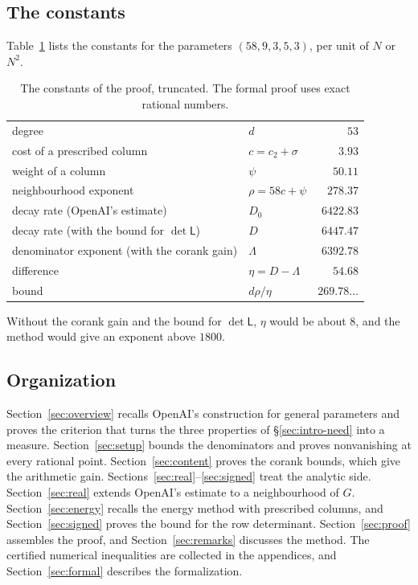 \documentclass[11pt]{amsart}
\theoremstyle{definition}
\theoremstyle{remark}
\numberwithin{equation}{section}
\begin{document}
\subsection{The constants}
Table~\ref{tab:constants} lists the constants for the parameters $(58,9,3,5,3)$, per unit of $N$ or $N^2$.
\begin{table}[ht]\centering
\begin{tabular}{@{}llr@{}}\toprule
degree & $d$ & $53$\\
cost of a prescribed column & $c=c_2+\sigma$ & $3.93$\\
weight of a column & $\psi$ & $50.11$\\
neighbourhood exponent & $\rho=58c+\psi$ & $278.37$\\
decay rate (OpenAI's estimate) & $D_0$ & $6422.83$\\
decay rate (with the bound for $\det\mathsf L$) & $D$ & $6447.47$\\
denominator exponent (with the corank gain) & $\Lambda$ & $6392.78$\\
difference & $\eta=D-\Lambda$ & $54.68$\\
\midrule
bound & $d\rho/\eta$ & $269.78\ldots$\\\bottomrule
\end{tabular}
\caption{The constants of the proof, truncated. The formal proof uses exact rational numbers.}
\label{tab:constants}\end{table}
Without the corank gain and the bound for $\det\mathsf L$, $\eta$ would be about $8$, and the method would give an
exponent above $1800$.

\subsection{Organization}
Section~\ref{sec:overview} recalls OpenAI's construction for general parameters and proves the criterion
that turns the three properties of \S\ref{sec:intro-need} into a measure. Section~\ref{sec:setup} bounds the
denominators and proves nonvanishing at every rational point. Section~\ref{sec:content} proves the corank
bounds, which give the arithmetic gain. Sections~\ref{sec:real}--\ref{sec:signed} treat the analytic side.
Section~\ref{sec:real} extends OpenAI's estimate to a neighbourhood of $G$. Section~\ref{sec:energy} recalls
the energy method with prescribed columns, and Section~\ref{sec:signed} proves the bound for the row
determinant. Section~\ref{sec:proof} assembles the proof, and Section~\ref{sec:remarks} discusses the
method. The certified numerical inequalities are collected in the appendices, and
Section~\ref{sec:formal} describes the formalization.
\end{document}
